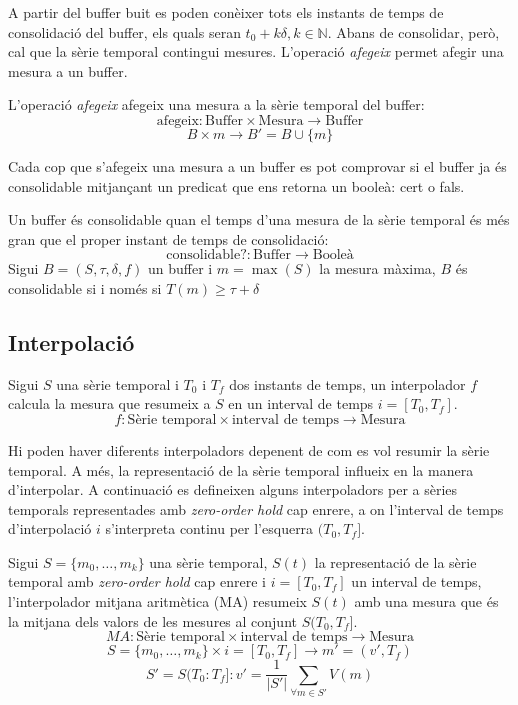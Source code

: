 A partir del buffer buit es poden conèixer tots els instants de temps de consolidació del buffer, els quals seran $t_0+k\delta, k\in\mathbb{N}$. 
Abans de consolidar, però, cal que la sèrie temporal contingui mesures. L'operació \emph{afegeix} permet afegir una mesura a un buffer.

\begin{definition}
  L'operació \emph{afegeix} afegeix una mesura a la sèrie temporal del buffer:
  \[
  \text{afegeix}: \text{Buffer} \times \text{Mesura} \longrightarrow \text{Buffer}
  \]
  \[
   B \times m \longrightarrow B'= B \cup \{m\}
   \]
\end{definition}

Cada cop que s'afegeix una mesura a un buffer es pot comprovar si el buffer ja és consolidable mitjançant un predicat que ens retorna un booleà: cert o fals. 

\begin{definition}
  Un buffer és consolidable quan el temps d'una mesura de la sèrie temporal és més gran que el proper instant de temps de consolidació:
  \[
  \text{consolidable?}: \text{Buffer} \longrightarrow \text{Booleà}
  \]
  Sigui $B=(S,\tau,\delta,f)$ un buffer i $m=\max(S)$ la mesura màxima, $B$ és consolidable si i només si $T(m) \geq \tau+\delta$
\end{definition}


\subsection{Interpolació}
\label{sec:model:interpolador}

Sigui $S$ una sèrie temporal i $T_0$ i $T_f$ dos instants de temps, un interpolador $f$ calcula la mesura que resumeix a $S$ en un interval de temps $i=[T_0,T_f]$. 
\[
f: \text{Sèrie temporal} \times \text{interval de temps} \longrightarrow \text{Mesura}
\]

Hi poden haver diferents interpoladors depenent de com es vol resumir la sèrie temporal. A més, la representació de la sèrie temporal influeix en la manera d'interpolar. A continuació es defineixen alguns interpoladors per a sèries temporals representades amb  \emph{zero-order hold} cap enrere, a on l'interval de temps d'interpolació $i$ s'interpreta continu per l'esquerra $(T_0,T_f]$. 


\begin{definition}
  Sigui $S=\{m_0,\ldots,m_k\}$ una sèrie temporal, $S(t)$ la
  representació de la sèrie temporal amb \emph{zero-order hold} cap
  enrere i $i=[T_0,T_f]$ un interval de temps, l'interpolador mitjana
  aritmètica (MA) resumeix $S(t)$ amb una mesura que és la mitjana dels
  valors de les mesures al conjunt $S(T_0,T_f]$.
\[
MA: \text{Sèrie temporal} \times \text{interval de temps}
\longrightarrow \text{Mesura}
\]
\[
S=\{m_0,\ldots,m_k\} \times i=[T_0,T_f] \longrightarrow m'=(v',T_f)
\]
\[
S'=S(T_0:T_f]:
v' = \frac{1}{|S'|} \sum\limits_{\forall m\in S'} V(m)
\]
\end{definition}

